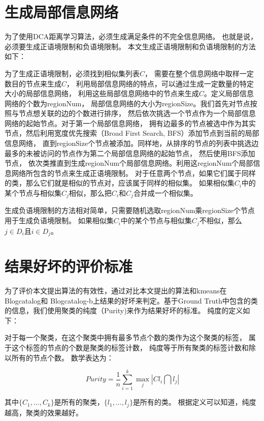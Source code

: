 \section{生成局部信息网络}

为了使用DCA距离学习算法，必须生成满足条件的不完全信息网络。
也就是说，必须要生成正语境限制和负语境限制。
本文生成正语境限制和负语境限制的方法如下：

为了生成正语境限制，必须找到相似集列表$C$，
需要在整个信息网络中取样一定数目的节点来生成$C$，
利用局部信息网络的特点，可以通过生成一定数量的特定大小的局部信息网络，
利用这些局部信息网络中的节点来生成$C$。定义局部信息网络的个数为regionNum，
局部信息网络的大小为regionSize。我们首先对节点按照与节点想关联的边的个数进行排序，
然后依次挑选一个节点作为一个局部信息网络的起始节点。对于第一个局部信息网络，
拥有边最多的节点被选中作为其实节点，然后利用宽度优先搜索（Broad First Search, BFS）添加节点到当前的局部信息网络，
直到regionSize个节点被添加。同样地，从排序的节点的列表中挑选边最多的未被访问的节点作为第二个局部信息网络的起始节点，
然后使用BFS添加节点，
依次类推直到生成regionNum个局部信息网络。利用这regionNum个局部信息网络所包含的节点来生成正语境限制。
对于任意两个节点，如果它们属于同样的类，那么它们就是相似的节点对，应该属于同样的相似集。
如果相似集$C_i$中的某个节点与相似集$C_j$相似，那么把$C_i$和$C_j$合并成一个相似集。

生成负语境限制的方法相对简单，只需要随机选取regionNum乘regionSize个节点用于生成负语境限制。
如果相似集$C_i$中的某个节点与相似集$C_j$不相似，那么$j \in D_i$且$i \in D_j$。

\section{结果好坏的评价标准}

为了评价本文提出算法的有效性，通过对比本文提出的算法和kmeans在Blogcatalog和
Blogcatalog-b上结果的好坏来判定。基于Ground Truth中包含的类的信息，我们使用聚类的纯度（Purity)来作为结果好坏的标准。
纯度的定义如下：

对于每一个聚类，在这个聚类中拥有最多节点个数的类作为这个聚类的标签，
属于这个标签的节点的个数是聚类的标签计数，
纯度等于所有聚类的标签计数和除以所有的节点个数。
数学表达为：

$$
Purity = \frac{1}{n} \sum_{i=1}^k \operatorname{max}_j |Cl_i \bigcap l_j|
$$

其中$\{C_1, ..., C_k\}$是所有的聚类，$\{l_1, ..., l_j\}$是所有的类。
根据定义可以知道，纯度越高，聚类的效果越好。
